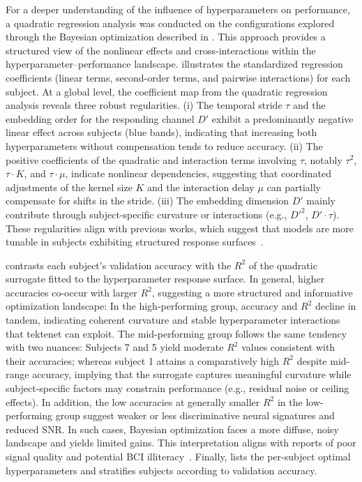 For a deeper understanding of the influence of hyperparameters on performance, a quadratic regression analysis was conducted on the configurations explored through the Bayesian optimization described in . This approach provides a structured view of the nonlinear effects and cross-interactions within the hyperparameter–performance landscape.  illustrates the standardized regression coefficients (linear terms, second-order terms, and pairwise interactions) for each subject. At a global level, the coefficient map from the quadratic regression analysis reveals three robust regularities. (i) The temporal stride $\tau$ and the embedding order for the responding channel  $D'$ exhibit a predominantly negative linear effect across subjects (blue bands), indicating that increasing both hyperparameters without compensation tends to reduce accuracy. (ii) The positive coefficients of the quadratic and interaction terms involving $\tau$, notably $\tau^2$, $\tau\cdot K$, and $\tau\cdot\mu$, indicate nonlinear dependencies, suggesting that coordinated adjustments of the kernel size $K$ and the interaction delay $\mu$ can partially compensate for shifts in the stride. (iii) The embedding dimension $D'$ mainly contribute through subject-specific curvature or interactions (e.g., $D'^2$, $D'\cdot\tau$). These regularities align with previous works, which suggest that models are more tunable in subjects exhibiting structured response surfaces~\cite{PENAS, RIJIN}.

 contrasts each subject's validation accuracy with the $R^2$ of the quadratic surrogate fitted to the hyperparameter response surface. In general, higher accuracies co-occur with larger $R^2$, suggesting a more structured and informative optimization landscape: In the high-performing group, accuracy and $R^2$ decline in tandem, indicating coherent curvature and stable hyperparameter interactions that \gls{tektenet} can exploit. The mid-performing group follows the same tendency with two nuances: Subjects 7 and 5 yield moderate $R^2$ values consistent with their accuracies; whereas subject 1 attains a comparatively high $R^2$ despite mid-range accuracy, implying that the surrogate captures meaningful curvature while subject-specific factors may constrain performance (e.g., residual noise or ceiling effects). In addition, the low accuracies at generally smaller $R^2$ in the low-performing group suggest weaker or less discriminative neural signatures and reduced SNR. In such cases, Bayesian optimization faces a more diffuse, noisy landscape and yields limited gains. This interpretation aligns with reports of poor signal quality and potential BCI illiteracy~\cite{roy2020deep,ashburner2011multivariate}. Finally,  lists the per-subject optimal hyperparameters and stratifies subjects according to validation accuracy.

